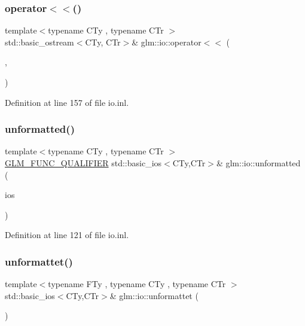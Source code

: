 \subsubsection{\texorpdfstring{operator$<$$<$()}{operator<<()}\hspace{0.1cm}{\footnotesize\ttfamily [7/7]}}
{\footnotesize\ttfamily template$<$typename C\+Ty , typename C\+Tr $>$ \\
std\+::basic\+\_\+ostream$<$C\+Ty, C\+Tr$>$\& glm\+::io\+::operator$<$$<$ (\begin{DoxyParamCaption}\item[{std\+::basic\+\_\+ostream$<$ C\+Ty, C\+Tr $>$ \&}]{,  }\item[{\hyperlink{structglm_1_1io_1_1order}{order} const \&}]{ }\end{DoxyParamCaption})}



Definition at line 157 of file io.\+inl.

\mbox{\label{namespaceglm_1_1io_a833a8c96b3d84f7aa76e0c3e6845503e}} 
\subsubsection{\texorpdfstring{unformatted()}{unformatted()}}
{\footnotesize\ttfamily template$<$typename C\+Ty , typename C\+Tr $>$ \\
\hyperlink{setup_8hpp_a33fdea6f91c5f834105f7415e2a64407}{G\+L\+M\+\_\+\+F\+U\+N\+C\+\_\+\+Q\+U\+A\+L\+I\+F\+I\+ER} std\+::basic\+\_\+ios$<$C\+Ty,C\+Tr$>$\& glm\+::io\+::unformatted (\begin{DoxyParamCaption}\item[{std\+::basic\+\_\+ios$<$ C\+Ty, C\+Tr $>$ \&}]{ios }\end{DoxyParamCaption})}



Definition at line 121 of file io.\+inl.

\mbox{\label{namespaceglm_1_1io_a3095de031a9c7c3dd9bab670381c3cdb}} 
\subsubsection{\texorpdfstring{unformattet()}{unformattet()}}
{\footnotesize\ttfamily template$<$typename F\+Ty , typename C\+Ty , typename C\+Tr $>$ \\
std\+::basic\+\_\+ios$<$C\+Ty,C\+Tr$>$\& glm\+::io\+::unformattet (\begin{DoxyParamCaption}\item[{std\+::basic\+\_\+ios$<$ C\+Ty, C\+Tr $>$ \&}]{ }\end{DoxyParamCaption})}

